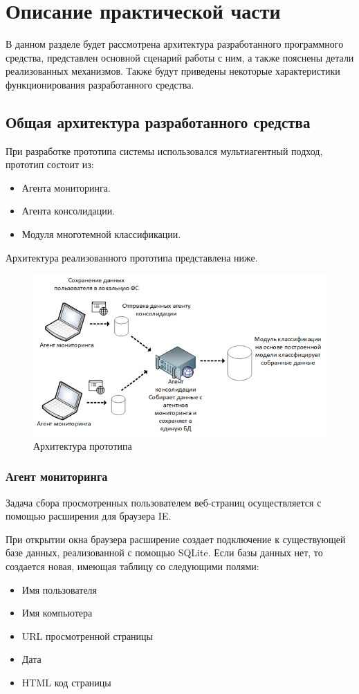 \documentclass[russian, utf8, emptystyle]{eskdtext}
\begin{document}
\section{Описание практической части}
В данном разделе будет рассмотрена архитектура разработанного программного средства, представлен основной сценарий работы с ним, а также пояснены детали реализованных механизмов. Также будут приведены некоторые характеристики функционирования разработанного средства.
\subsection{Общая архитектура разработанного средства}
При разработке прототипа системы использовался мультиагентный подход, прототип состоит из:
\begin{itemize}
	\item Агента мониторинга.
	\item Агента консолидации.
	\item Модуля многотемной классификации.
\end{itemize}
Архитектура реализованного прототипа представлена ниже.
	\begin{figure}[h]
		\begin{center}
			\includegraphics[width=12cm]{pic/arch.png}
			\caption{Архитектура прототипа}
			\label{fig:low_sigma}
		\end{center}
	\end{figure}
\subsubsection{Агент мониторинга}
Задача сбора просмотренных пользователем веб-страниц осуществляется с помощью расширения для браузера IE.

При открытии окна браузера расширение создает подключение к существующей базе данных, реализованной с помощью SQLite. Если базы данных нет, то создается новая, имеющая таблицу со следующими полями:
\begin{itemize}
	\item Имя пользователя
	\item Имя компьютера
	\item URL просмотренной страницы
	\item Дата
	\item HTML код страницы
\end{itemize}
\end{document}
